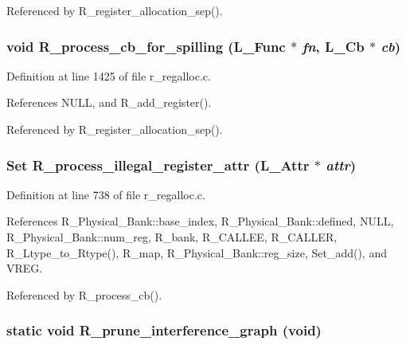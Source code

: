 Referenced by R\_\-register\_\-allocation\_\-sep().
\subsubsection{\setlength{\rightskip}{0pt plus 5cm}void R\_\-process\_\-cb\_\-for\_\-spilling (L\_\-Func $\ast$ {\em fn}, L\_\-Cb $\ast$ {\em cb})}\label{r__regalloc_8c_2b42fb871244f5a41e35744f4c6efb6f}




Definition at line 1425 of file r\_\-regalloc.c.

References NULL, and R\_\-add\_\-register().

Referenced by R\_\-register\_\-allocation\_\-sep().
\subsubsection{\setlength{\rightskip}{0pt plus 5cm}\bf{Set} R\_\-process\_\-illegal\_\-register\_\-attr (L\_\-Attr $\ast$ {\em attr})}\label{r__regalloc_8c_8590847b25b2f501832ac37911a7e984}




Definition at line 738 of file r\_\-regalloc.c.

References R\_\-Physical\_\-Bank::base\_\-index, R\_\-Physical\_\-Bank::defined, NULL, R\_\-Physical\_\-Bank::num\_\-reg, R\_\-bank, R\_\-CALLEE, R\_\-CALLER, R\_\-Ltype\_\-to\_\-Rtype(), R\_\-map, R\_\-Physical\_\-Bank::reg\_\-size, Set\_\-add(), and VREG.

Referenced by R\_\-process\_\-cb().
\subsubsection{\setlength{\rightskip}{0pt plus 5cm}static void R\_\-prune\_\-interference\_\-graph (void)\hspace{0.3cm}{\tt  [static]}}\label{r__regalloc_8c_522c744cf79506d73850c19a8eedaafa}




